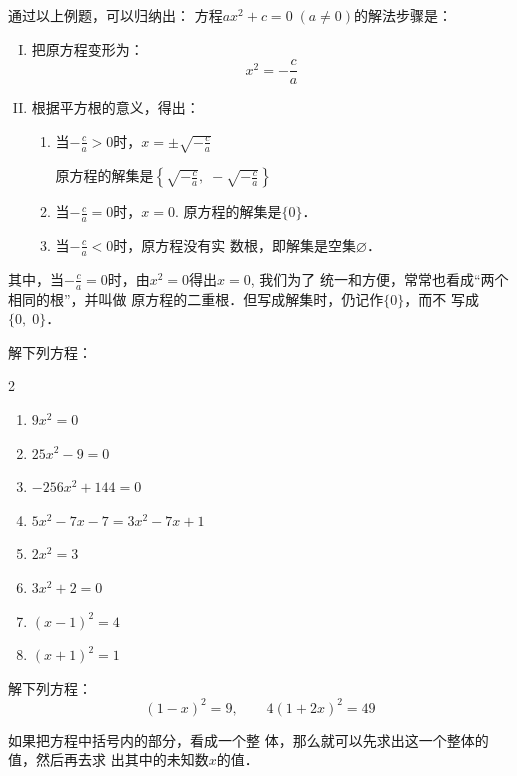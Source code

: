通过以上例题，可以归纳出：
方程$ax^2+c=0\; (a\ne 0)$的解法步骤是：
\begin{blk}{}
\begin{enumerate}[I. ]
    \item 把原方程变形为：
    $$x^2=-\frac{c}{a}$$
    \item 根据平方根的意义，得出：
    \begin{enumerate}[1.]
        \item 当$-\frac{c}{a}>0$时，$x=\pm\sqrt{-\frac{c}{a}}$

    原方程的解集是$\left\{\sqrt{-\frac{c}{a}}, \; -\sqrt{-\frac{c}{a}}\right\}$
    \item 当$-\frac{c}{a}=0$时，$x=0$.
    原方程的解集是$\{0\}$．
    \item 当$-\frac{c}{a}<0$时，原方程没有实
    数根，即解集是空集$\varnothing$．
    \end{enumerate}
\end{enumerate}
\end{blk}

其中，当$-\frac{c}{a}=0$时，由$x^2=0$得出$x=0$, 我们为了
统一和方便，常常也看成“两个相同的根”，并叫做
原方程的二重根．但写成解集时，仍记作$\{0\}$，而不
写成$\{0,\; 0\}$．

\begin{ex}
    解下列方程：
\begin{multicols}{2}
\begin{enumerate}
    \item $9x^2=0$
    \item $25x^2-9=0$
    \item $-256x^2+144=0$ 
    \item $5x^2-7x-7=3x^2-7x+1$
    \item $2x^2=3$
    \item $3x^2+2=0$
    \item $(x-1)^2=4$
    \item $(x+1)^2=1$
\end{enumerate}
\end{multicols}
\end{ex}


\begin{example}
    解下列方程：
    \[(1-x)^2=9,\qquad 4(1+2x)^2=49\]
\end{example}

\begin{analyze}
    如果把方程中括号内的部分，看成一个整
体，那么就可以先求出这一个整体的值，然后再去求
出其中的未知数$x$的值．
\end{analyze}

